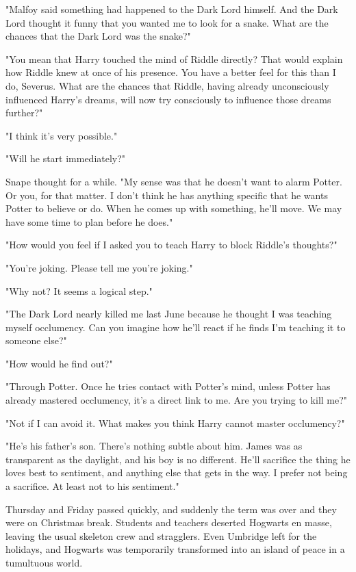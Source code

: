 "Malfoy said something had happened to the Dark Lord himself. And the Dark Lord thought it funny that you wanted me to look for a snake. What are the chances that the Dark Lord was the snake?"

"You mean that Harry touched the mind of Riddle directly? That would explain how Riddle knew at once of his presence. You have a better feel for this than I do, Severus. What are the chances that Riddle, having already unconsciously influenced Harry's dreams, will now try consciously to influence those dreams further?"

"I think it's very possible."

"Will he start immediately?"

Snape thought for a while. "My sense was that he doesn't want to alarm Potter. Or you, for that matter. I don't think he has anything specific that he wants Potter to believe or do. When he comes up with something, he'll move. We may have some time to plan before he does."

"How would you feel if I asked you to teach Harry to block Riddle's thoughts?"

"You're joking. Please tell me you're joking."

"Why not? It seems a logical step."

"The Dark Lord nearly killed me last June because he thought I was teaching myself occlumency. Can you imagine how he'll react if he finds I'm teaching it to someone else?"

"How would he find out?"

"Through Potter. Once he tries contact with Potter's mind, unless Potter has already mastered occlumency, it's a direct link to me. Are you trying to kill me?"

"Not if I can avoid it. What makes you think Harry cannot master occlumency?"

"He's his father's son. There's nothing subtle about him. James was as transparent as the daylight, and his boy is no different. He'll sacrifice the thing he loves best to sentiment, and anything else that gets in the way. I prefer not being a sacrifice. At least not to his sentiment."

Thursday and Friday passed quickly, and suddenly the term was over and they were on Christmas break. Students and teachers deserted Hogwarts en masse, leaving the usual skeleton crew and stragglers. Even Umbridge left for the holidays, and Hogwarts was temporarily transformed into an island of peace in a tumultuous world.

